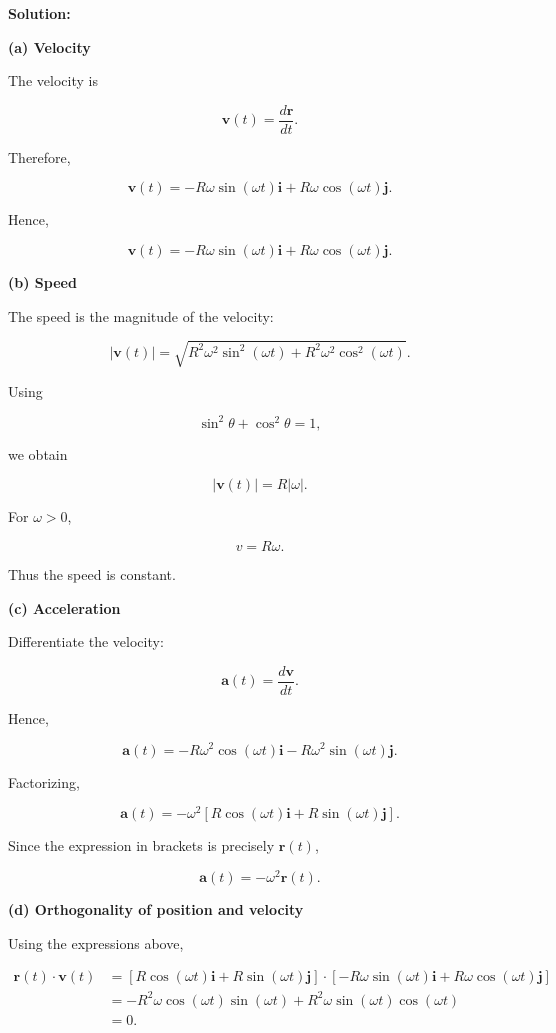 \documentclass[12pt]{article}
\theoremstyle{remark}
\begin{document}
\textbf{Solution:}

\textbf{(a) Velocity}

The velocity is

\[
\mathbf{v}(t)
=
\frac{d\mathbf{r}}{dt}.
\]

Therefore,

\[
\mathbf{v}(t)
=
-R\omega\sin(\omega t)\mathbf{i}
+
R\omega\cos(\omega t)\mathbf{j}.
\]

Hence,

\[
\boxed{
\mathbf{v}(t)
=
-R\omega\sin(\omega t)\mathbf{i}
+
R\omega\cos(\omega t)\mathbf{j}.
}
\]

\textbf{(b) Speed}

The speed is the magnitude of the velocity:

\[
|\mathbf{v}(t)|
=
\sqrt{
R^2\omega^2\sin^2(\omega t)
+
R^2\omega^2\cos^2(\omega t)
}.
\]

Using

\[
\sin^2\theta+\cos^2\theta=1,
\]

we obtain

\[
|\mathbf{v}(t)|
=
R|\omega|.
\]

For \(\omega>0\),

\[
\boxed{
v=R\omega.
}
\]

Thus the speed is constant.

\textbf{(c) Acceleration}

Differentiate the velocity:

\[
\mathbf{a}(t)
=
\frac{d\mathbf{v}}{dt}.
\]

Hence,

\[
\mathbf{a}(t)
=
-R\omega^2\cos(\omega t)\mathbf{i}
-
R\omega^2\sin(\omega t)\mathbf{j}.
\]

Factorizing,

\[
\boxed{
\mathbf{a}(t)
=
-\omega^2
\left[
R\cos(\omega t)\mathbf{i}
+
R\sin(\omega t)\mathbf{j}
\right].
}
\]

Since the expression in brackets is precisely \(\mathbf{r}(t)\),

\[
\boxed{
\mathbf{a}(t)=-\omega^2\mathbf{r}(t).
}
\]

\textbf{(d) Orthogonality of position and velocity}

Using the expressions above,

\begin{align}
\mathbf{r}(t)\cdot\mathbf{v}(t)
&=
\left[
R\cos(\omega t)\mathbf{i}
+
R\sin(\omega t)\mathbf{j}
\right]
\cdot
\left[
-R\omega\sin(\omega t)\mathbf{i}
+
R\omega\cos(\omega t)\mathbf{j}
\right]
\\
&=
-R^2\omega\cos(\omega t)\sin(\omega t)
+
R^2\omega\sin(\omega t)\cos(\omega t)
\\
&=0.
\end{align}
\end{document}
